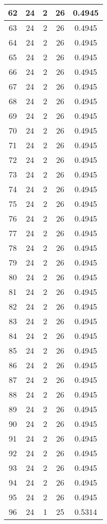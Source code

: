 \documentclass[letterpaper, 12pt]{article}
\begin{document}
\begin{longtable}{|c|c|c|c|c|}
\hline
62 & 24 & 2 & 26 & 0.4945 \\
\hline
63 & 24 & 2 & 26 & 0.4945 \\
\hline
64 & 24 & 2 & 26 & 0.4945 \\
\hline
65 & 24 & 2 & 26 & 0.4945 \\
\hline
66 & 24 & 2 & 26 & 0.4945 \\
\hline
67 & 24 & 2 & 26 & 0.4945 \\
\hline
68 & 24 & 2 & 26 & 0.4945 \\
\hline
69 & 24 & 2 & 26 & 0.4945 \\
\hline
70 & 24 & 2 & 26 & 0.4945 \\
\hline
71 & 24 & 2 & 26 & 0.4945 \\
\hline
72 & 24 & 2 & 26 & 0.4945 \\
\hline
73 & 24 & 2 & 26 & 0.4945 \\
\hline
74 & 24 & 2 & 26 & 0.4945 \\
\hline
75 & 24 & 2 & 26 & 0.4945 \\
\hline
76 & 24 & 2 & 26 & 0.4945 \\
\hline
77 & 24 & 2 & 26 & 0.4945 \\
\hline
78 & 24 & 2 & 26 & 0.4945 \\
\hline
79 & 24 & 2 & 26 & 0.4945 \\
\hline
80 & 24 & 2 & 26 & 0.4945 \\
\hline
81 & 24 & 2 & 26 & 0.4945 \\
\hline
82 & 24 & 2 & 26 & 0.4945 \\
\hline
83 & 24 & 2 & 26 & 0.4945 \\
\hline
84 & 24 & 2 & 26 & 0.4945 \\
\hline
85 & 24 & 2 & 26 & 0.4945 \\
\hline
86 & 24 & 2 & 26 & 0.4945 \\
\hline
87 & 24 & 2 & 26 & 0.4945 \\
\hline
88 & 24 & 2 & 26 & 0.4945 \\
\hline
89 & 24 & 2 & 26 & 0.4945 \\
\hline
90 & 24 & 2 & 26 & 0.4945 \\
\hline
91 & 24 & 2 & 26 & 0.4945 \\
\hline
92 & 24 & 2 & 26 & 0.4945 \\
\hline
93 & 24 & 2 & 26 & 0.4945 \\
\hline
94 & 24 & 2 & 26 & 0.4945 \\
\hline
95 & 24 & 2 & 26 & 0.4945 \\
\hline
96 & 24 & 1 & 25 & 0.5314 \\

\end{longtable}
\end{document}
